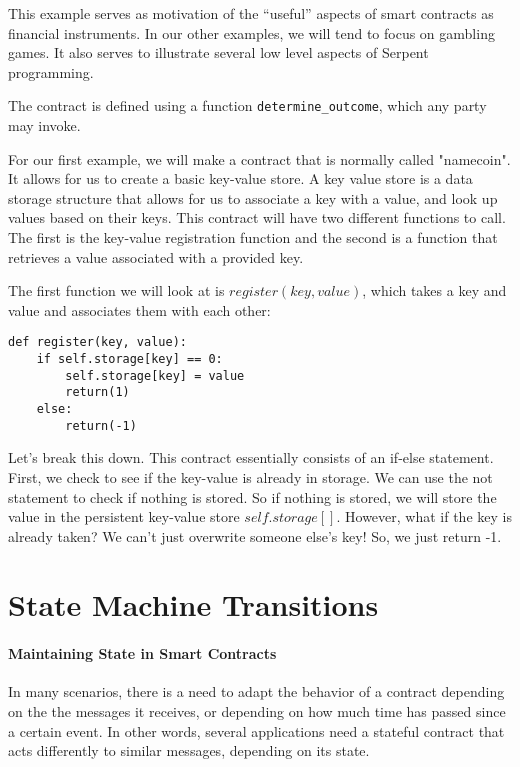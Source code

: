 \documentclass[10pt,twocolumn,letterpaper]{article}
\begin{document}
This example serves as motivation of the ``useful'' aspects of smart contracts as financial instruments. In our other examples, we will tend to focus on gambling games. It also serves to illustrate several low level aspects of Serpent programming.

The contract is defined using a function \texttt{determine\_outcome}, which any party may invoke.

For our first example, we will make a contract that is normally called "namecoin". It allows for us to create a basic key-value store. A key value store is a data storage structure that allows for us to associate a key with a value, and look up values based on their keys. This contract will have two different functions to call. The first is the key-value registration function and the second is a function that retrieves a value associated with a provided key.

The first function we will look at is $register(key, value)$, which takes a key and value and associates them with each other:

\begin{mdframed}
\begin{verbatim}
def register(key, value):
	if self.storage[key] == 0:
		self.storage[key] = value
		return(1)
	else:
		return(-1)
\end{verbatim}
\end{mdframed}

Let's break this down. This contract essentially consists of an if-else statement. First, we check to see if the key-value is already in storage. We can use the not statement to check if nothing is stored. So if nothing is stored, we will store the value in the persistent key-value store $self.storage[]$. However, what if the key is already taken? We can't just overwrite someone else's key! So, we just return -1. 

\section{State Machine Transitions}

\paragraph{Maintaining State in Smart Contracts}

In many scenarios, there is a need to adapt the behavior of a contract depending on the the messages it receives, or depending on how much time has passed since a certain event. In other words, several applications need a stateful contract that acts differently to similar messages, depending on its state.
\end{document}
